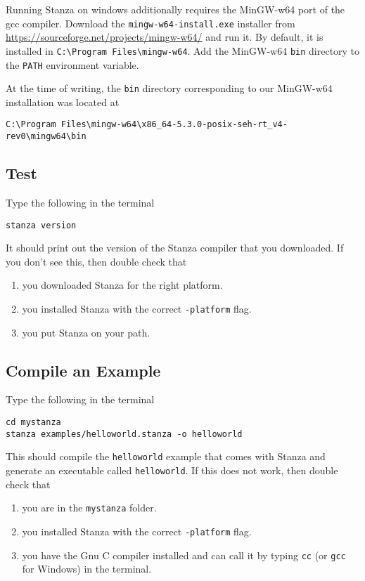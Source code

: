 \documentclass[10pt,oneside]{book}
\begin{document}
Running Stanza on windows additionally requires the MinGW-w64 port of the gcc compiler. Download the \texttt{\frenchspacing mingw-w64-install.exe} installer from \href{https://sourceforge.net/projects/mingw-w64/}{https://sourceforge.net/projects/mingw-w64/} and run it. By default, it is installed in \texttt{\frenchspacing C:\textbackslash Program Files\textbackslash mingw-w64}. Add the MinGW-w64 \texttt{\frenchspacing bin} directory to the \texttt{\frenchspacing PATH} environment variable.

At the time of writing, the \texttt{\frenchspacing bin} directory corresponding to our MinGW-w64 installation was located at
\begin{lstlisting}
C:\Program Files\mingw-w64\x86_64-5.3.0-posix-seh-rt_v4-rev0\mingw64\bin
\end{lstlisting}

\subsection*{Test}
Type the following in the terminal
\begin{lstlisting}
stanza version
\end{lstlisting}
It should print out the version of the Stanza compiler that you downloaded. If you don't see this, then double check that
\begin{enumerate}
\item you downloaded Stanza for the right platform.
\item you installed Stanza with the correct \texttt{\frenchspacing -platform} flag.
\item you put Stanza on your path.
\end{enumerate}

\subsection*{Compile an Example}
Type the following in the terminal
\begin{lstlisting}
cd mystanza
stanza examples/helloworld.stanza -o helloworld
\end{lstlisting}
This should compile the \texttt{\frenchspacing helloworld} example that comes with Stanza and generate an executable called \texttt{\frenchspacing helloworld}. If this does not work, then double check that
\begin{enumerate}
\item you are in the \texttt{\frenchspacing mystanza} folder.
\item you installed Stanza with the correct \texttt{\frenchspacing -platform} flag.
\item you have the Gnu C compiler installed and can call it by typing \texttt{\frenchspacing cc} (or \texttt{\frenchspacing gcc} for Windows) in the terminal.
\end{enumerate}
\end{document}
